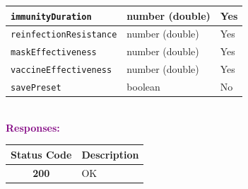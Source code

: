 \begin{tcolorbox}[
    colback=green!5,
    colframe=green,
    arc=2mm,
    boxrule=1pt,
    left=5pt,
    right=5pt,
    top=5pt,
    bottom=5pt
]
\begin{tabular}{|l|l|l|}
\texttt{immunityDuration} & number (double) & Yes \\ \hline
\rowcolor{gray!5}
\texttt{reinfectionResistance} & number (double) & Yes \\ \hline
\texttt{maskEffectiveness} & number (double) & Yes \\ \hline
\rowcolor{gray!5}
\texttt{vaccineEffectiveness} & number (double) & Yes \\ \hline
\texttt{savePreset} & boolean & No \\ \hline
\end{tabular}\\[0.5em]
\vspace{0.3em}
\textbf{\textcolor{purple}{Responses:}}\\[0.2em]
\begin{tabular}{|c|p{10cm}|}
\hline
\rowcolor{gray!20}
\textbf{Status Code} & \textbf{Description} \\ \hline
\colorbox{green!20}{\textbf{200}} & OK \\ \hline
\end{tabular}
\end{tcolorbox}
\vspace{0.5em}

